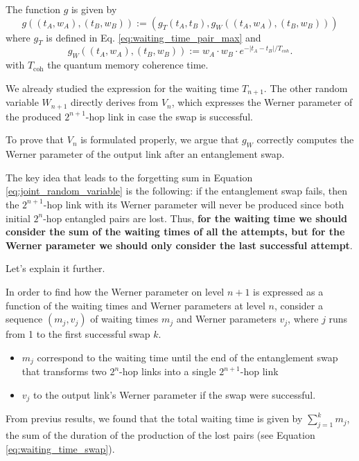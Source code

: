 \documentclass{masterthesis}
\begin{document}
The function $g$ is given by
\begin{equation}
    g\left((t_A, w_A),(t_B, w_B)\right) := \left(g_T(t_A, t_B), g_W\left((t_A, w_A),(t_B, w_B)\right)\right)
\end{equation}
where $g_T$ is defined in Eq. \ref{eq:waiting_time_pair_max} and
\begin{equation}
    g_W\left((t_A, w_A),(t_B, w_B)\right) := w_A \cdot w_B \cdot e^{-\left|t_{A}-t_{B}\right| / T_{coh}} .
\end{equation}
with $T_{\text{coh}}$ the quantum memory coherence time.

We already studied the expression for the waiting time $T_{n+1}$. The other random variable $W_{n+1}$ directly derives from $V_{n}$, which expresses the Werner parameter of the produced $2^{n+1}$-hop link in case the swap is successful.

To prove that $V_{n}$ is formulated properly, we argue that $g_{W}$ correctly computes the Werner parameter of the output link after an entanglement swap.

The key idea that leads to the forgetting sum in Equation \ref{eq:joint_random_variable} is the following: if the entanglement swap fails, then the $2^{n+1}$-hop link with its Werner parameter will never be produced since both initial $2^{n}$-hop entangled pairs are lost. Thus, \textbf{for the waiting time we should consider the sum of the waiting times of all the attempts, but for the Werner parameter we should only consider the last successful attempt}.

Let's explain it further.

In order to find how the Werner parameter on level $n+1$ is expressed as a function of the waiting times and Werner parameters at level $n$, consider a sequence $\left(m_{j}, v_{j}\right)$ of waiting times $m_{j}$ and Werner parameters $v_{j}$, where $j$ runs from 1 to the first successful swap $k$. 
\begin{itemize}
    \item $m_{j}$ correspond to the waiting time until the end of the entanglement swap that transforms two $2^{n}$-hop links into a single $2^{n+1}$-hop link
    \item $v_{j}$ to the output link's Werner parameter if the swap were successful. 
\end{itemize}

From previus results, we found that the total waiting time is given by $\sum_{j=1}^{k} m_{j}$, the sum of the duration of the production of the lost pairs (see Equation \ref{eq:waiting_time_swap}). %
\end{document}

